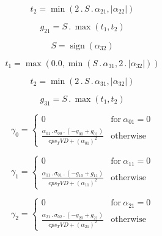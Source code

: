 \documentclass{article}
\begin{document}
\begin{dmath}t_{2} = \min\left(2 \,.\, S \,.\, \alpha_{21}, \left|{\alpha_{22}}\right|\right)\end{dmath}

\begin{dmath}g_{21} = S \,.\, \max\left(t_{1}, t_{2}\right)\end{dmath}

\begin{dmath}S = \operatorname{sign}{\left (\alpha_{32} \right )}\end{dmath}

\begin{dmath}t_{1} = \max\left(0.0, \min\left(S \,.\, \alpha_{31}, 2 \,.\, \left|{\alpha_{32}}\right|\right)\right)\end{dmath}

\begin{dmath}t_{2} = \min\left(2 \,.\, S \,.\, \alpha_{31}, \left|{\alpha_{32}}\right|\right)\end{dmath}

\begin{dmath}g_{31} = S \,.\, \max\left(t_{1}, t_{2}\right)\end{dmath}

\begin{dmath}\gamma_{0} = \begin{cases} 0 & \text{for}\: \alpha_{01} = 0 \\\frac{\alpha_{01} \,.\, \sigma_{0 0} \,.\, \left(- g_{00} + g_{01}\right)}{eps_TVD + \left(\alpha_{01} \right)^{2}} & \text{otherwise} \end{cases}\end{dmath}

\begin{dmath}\gamma_{1} = \begin{cases} 0 & \text{for}\: \alpha_{11} = 0 \\\frac{\alpha_{11} \,.\, \sigma_{0 1} \,.\, \left(- g_{10} + g_{11}\right)}{eps_TVD + \left(\alpha_{11} \right)^{2}} & \text{otherwise} \end{cases}\end{dmath}

\begin{dmath}\gamma_{2} = \begin{cases} 0 & \text{for}\: \alpha_{21} = 0 \\\frac{\alpha_{21} \,.\, \sigma_{0 2} \,.\, \left(- g_{20} + g_{21}\right)}{eps_TVD + \left(\alpha_{21} \right)^{2}} & \text{otherwise} \end{cases}\end{dmath}
\end{document}
